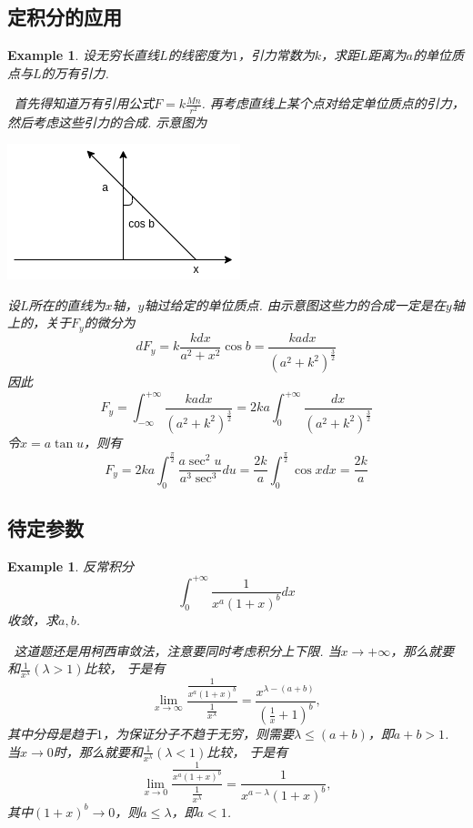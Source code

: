 \documentclass{article}
\newtheorem{example}[theorem]{Example}
\newcommand{\hints}{{\color{blue} \text{hints}}}
\begin{document}
\subsection{定积分的应用}

\begin{example}
\rm 设无穷长直线$L$的线密度为$1$，引力常数为$k$，求距$L$距离为$a$的单位质点与$L$的万有引力.

\hints\ 首先得知道万有引用公式$F = k \frac{Mn}{r^2}$. 再考虑直线上某个点对给定单位质点的引力，然后考虑这些引力的合成. 示意图为
\begin{center}
\includegraphics[scale=0.6]{images/universal_gravitation.png}
\end{center}
设$L$所在的直线为$x$轴，$y$轴过给定的单位质点. 由示意图这些力的合成一定是在$y$轴上的，关于$F_y$的微分为
$$
dF_y = k \frac{kdx}{a^2 + x^2} \cos b = \frac{kadx}{(a^2+k^2)^{\frac{3}{2}}}
$$
因此
$$
F_y = \int_{-\infty}^{+\infty} \frac{kadx}{(a^2+k^2)^{\frac{3}{2}}} = 2ka \int_{0}^{+\infty} \frac{dx}{(a^2+k^2)^{\frac{3}{2}}}
$$
令$x = a\tan u$，则有
$$
F_y = 2ka \int_{0}^{\frac{\pi}{2}} \frac{a\sec^2 u}{a^3\sec^3}du = \frac{2k}{a} \int_{0}^{\frac{\pi}{2}} \cos x dx = \frac{2k}{a}
$$
\end{example}

\subsection{待定参数}

\begin{example}
\rm 反常积分
$$
\int_0^{+\infty} \frac{1}{x^a(1+x)^b}dx
$$
收敛，求$a,b$.

\hints\ 这道题还是用柯西审敛法，注意要同时考虑积分上下限. 当$x \to +\infty$，那么就要和$\frac{1}{x^{\lambda}}(\lambda >1)$比较， 于是有
$$
\lim\limits_{x \to \infty} \frac{\frac{1}{x^a(1+x)^b}}{\frac{1}{x^{\lambda}}} = \frac{x^{\lambda-(a+b)}}{(\frac{1}{x}+1)^b},
$$
其中分母是趋于$1$，为保证分子不趋于无穷，则需要$\lambda \leq (a+b)$，即$a+b > 1$. 当$x \to 0$时，那么就要和$\frac{1}{x^{\lambda}}(\lambda < 1)$比较， 于是有
$$
\lim\limits_{x \to 0} \frac{\frac{1}{x^a(1+x)^b}}{\frac{1}{x^{\lambda}}} = \frac{1}{x^{a-\lambda}(1+x)^b},
$$
其中$(1+x)^b \to 0$，则$a \leq \lambda$，即$a < 1$.
\end{example}
\end{document}
